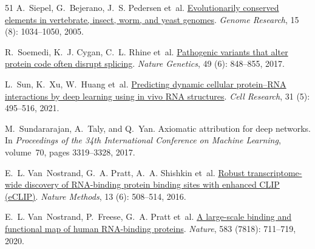 \begin{thebibliography}{51}
A.~Siepel, G.~Bejerano, J.~S. Pedersen et~al.
\newblock \href{https://doi.org/10.1101/gr.3715005}{Evolutionarily conserved
  elements in vertebrate, insect, worm, and yeast genomes}.
\newblock \emph{Genome Research}, 15 (8): 1034--1050, 2005.

R.~Soemedi, K.~J. Cygan, C.~L. Rhine et~al.
\newblock \href{https://doi.org/10.1038/ng.3837}{Pathogenic variants that alter
  protein code often disrupt splicing}.
\newblock \emph{Nature Genetics}, 49 (6): 848--855, 2017.

L.~Sun, K.~Xu, W.~Huang et~al.
\newblock \href{https://doi.org/10.1038/s41422-021-00476-y}{Predicting dynamic
  cellular protein--{RNA} interactions by deep learning using in vivo {RNA}
  structures}.
\newblock \emph{Cell Research}, 31 (5): 495--516, 2021.

M.~Sundararajan, A.~Taly, and Q.~Yan.
\newblock Axiomatic attribution for deep networks.
\newblock In \emph{Proceedings of the 34th International Conference on Machine
  Learning}, volume~70, pages 3319--3328, 2017.

E.~L. Van~Nostrand, G.~A. Pratt, A.~A. Shishkin et~al.
\newblock \href{https://doi.org/10.1038/nmeth.3810}{Robust transcriptome-wide
  discovery of RNA-binding protein binding sites with enhanced CLIP (eCLIP)}.
\newblock \emph{Nature Methods}, 13 (6): 508--514, 2016.

E.~L. Van~Nostrand, P.~Freese, G.~A. Pratt et~al.
\newblock \href{https://doi.org/10.1038/s41586-020-2077-3}{A large-scale
  binding and functional map of human RNA-binding proteins}.
\newblock \emph{Nature}, 583 (7818): 711--719, 2020.


\end{thebibliography}
